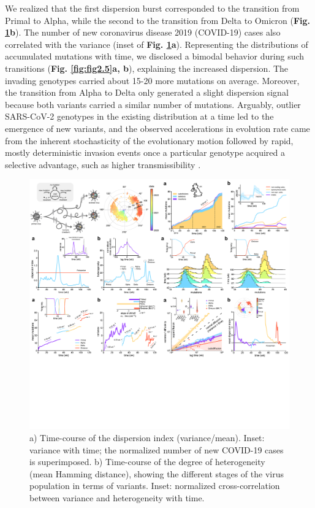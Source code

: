 We realized that the first dispersion burst corresponded to the transition from Primal to Alpha, while the second to the transition from Delta to Omicron (\textbf{Fig. \ref{fig:fig2.4}b}). The number of new coronavirus disease 2019 (COVID-19) cases also correlated with the variance (inset of \textbf{Fig. \ref{fig:fig2.4}a}). Representing the distributions of accumulated mutations with time, we disclosed a bimodal behavior during such transitions (\textbf{Fig. \ref{fig:fig2.5}a, b}), explaining the increased dispersion. The invading genotypes carried about 15-20 more mutations on average. Moreover, the transition from Alpha to Delta only generated a slight dispersion signal because both variants carried a similar number of mutations. Arguably, outlier SARS-CoV-2 genotypes in the existing distribution at a time led to the emergence of new variants, and the observed accelerations in evolution rate came from the inherent stochasticity of the evolutionary motion followed by rapid, mostly deterministic invasion events once a particular genotype acquired a selective advantage, such as higher transmissibility \cite{kraemer2021}. 

\begin{figure}[t]
    \centering
    \includegraphics[trim={0.2cm 26cm 25.35cm 11cm},clip, width=\linewidth]{assets/Ch2Fig.pdf}
    \caption{a) Time-course of the dispersion index (variance/mean). Inset: variance with time; the normalized number of new COVID-19 cases is superimposed. b) Time-course of the degree of heterogeneity (mean Hamming distance), showing the different stages of the virus population in terms of variants. Inset: normalized cross-correlation between variance and heterogeneity with time.}\label{fig:fig2.4}
\end{figure}

